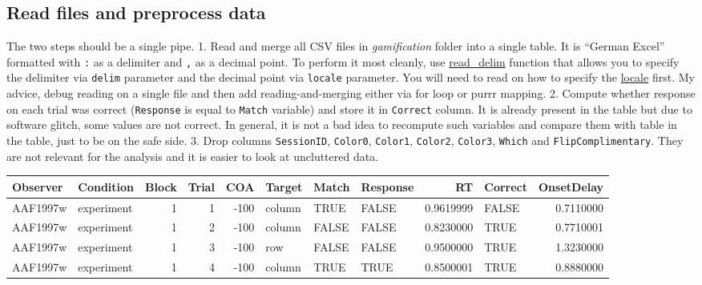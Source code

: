 \documentclass[
]{book}
\begin{document}
\hypertarget{read-files-and-preprocess-data}{%
\subsection*{Read files and preprocess data}\label{read-files-and-preprocess-data}}

The two steps should be a single pipe.
1. Read and merge all CSV files in \emph{gamification} folder into a single table. It is ``German Excel'' formatted with \texttt{:} as a delimiter and \texttt{,} as a decimal point. To perform it most cleanly, use \href{https://readr.tidyverse.org/reference/read_delim.html}{read\_delim}
function that allows you to specify the delimiter via \texttt{delim} parameter and the decimal point via \texttt{locale} parameter. You will need to read on how to specify the \href{https://readr.tidyverse.org/reference/locale.html}{locale} first. My advice, debug reading on a single file and then add reading-and-merging either via for loop or purrr mapping.
2. Compute whether response on each trial was correct (\texttt{Response} is equal to \texttt{Match} variable) and store it in \texttt{Correct} column. It is already present in the table but due to software glitch, some values are not correct. In general, it is not a bad idea to recompute such variables and compare them with table in the table, just to be on the safe side.
3. Drop columns \texttt{SessionID}, \texttt{Color0}, \texttt{Color1}, \texttt{Color2}, \texttt{Color3}, \texttt{Which} and \texttt{FlipComplimentary}. They are not relevant for the analysis and it is easier to look at uncluttered data.

\begin{tabular}{l|l|r|r|r|l|l|l|r|l|r}
\hline
Observer & Condition & Block & Trial & COA & Target & Match & Response & RT & Correct & OnsetDelay\\
\hline
AAF1997w & experiment & 1 & 1 & -100 & column & TRUE & FALSE & 0.9619999 & FALSE & 0.7110000\\
\hline
AAF1997w & experiment & 1 & 2 & -100 & column & FALSE & FALSE & 0.8230000 & TRUE & 0.7710001\\
\hline
AAF1997w & experiment & 1 & 3 & -100 & row & FALSE & FALSE & 0.9500000 & TRUE & 1.3230000\\
\hline
AAF1997w & experiment & 1 & 4 & -100 & column & TRUE & TRUE & 0.8500001 & TRUE & 0.8880000\\
\hline
\end{tabular}
\end{document}
